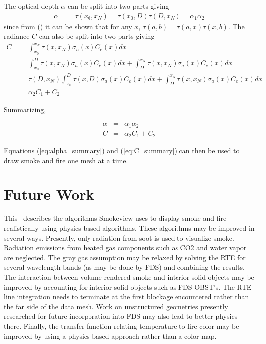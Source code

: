 \label{eq:optdepth}

The optical depth $\alpha$ can be split into two parts giving
\begin{eqnarray*}
\alpha&=&\tau(x_0,x_N)=\tau(x_0,D)\tau(D,x_N)=\alpha_1\alpha_2
\end{eqnarray*}
since from (\label{eq:optdepth}) it can be shown that for any $x$, $\tau(a,b)=\tau(a,x)\tau(x,b)$.
The radiance $C$ can also be split into two parts giving
\begin{eqnarray*}
C&=&\int_{x_0}^{x_N}\tau(x,x_N)\sigma_a(x)C_e(x)dx\\
&=&\int_{x_0}^{D}\tau(x,x_N)\sigma_a(x)C_e(x)dx+\int_{D}^{x_N}\tau(x,x_N)\sigma_a(x)C_e(x)dx\\
&=&\tau(D,x_N)\int_{x_0}^{D}\tau(x,D)\sigma_a(x)C_e(x)dx+\int_{D}^{x_N}\tau(x,x_N)\sigma_a(x)C_e(x)dx\\
&=&\alpha_2C_1+C_2
\end{eqnarray*}

Summarizing,

\begin{eqnarray}
\label{eq:alpha_summary}
\alpha&=&\alpha_1\alpha_2\\
\label{eq:C_summary}
C&=&\alpha_2C_1+C_2
\end{eqnarray}

Equations (\ref{eq:alpha_summary}) and (\ref{eq:C_summary}) can then be used to draw smoke and fire one mesh at a time.

\section{Future Work}
This \paper\ describes the algorithms Smokeview uses to display smoke and fire realistically using physics based algorithms.  These algorithms may be improved in several ways.  Presently, only radiation from soot is used to visualize smoke.  Radiation emissions from heated gas components such as CO2 and water vapor are neglected.  The gray gas assumption may be relaxed by solving the RTE for several wavelength bands (as may be done by FDS) and combining the results.  The interaction between volume rendered smoke and interior solid objects may be improved by accounting for interior solid objects such as FDS OBST's.  The RTE line integration needs to terminate at the first blockage encountered rather than the far side of the data mesh.  Work on unstructured geometries presently researched for future incorporation into FDS may also lead to better physics there.  Finally, the transfer function relating temperature to fire color may be improved by using a physics based approach rather than a color map.


